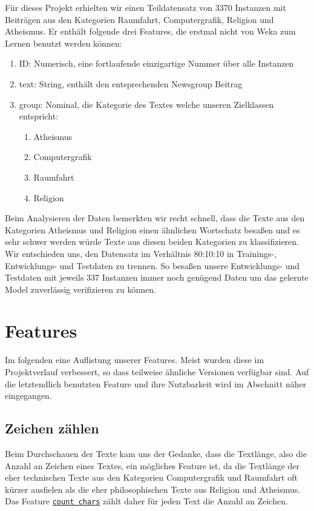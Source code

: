 \documentclass[
	11pt,
	a4paper
]{scrartcl}
\newcommand{\code}[1]{\texttt{\ul{#1}}}
\begin{document}
Für dieses Projekt erhielten wir einen Teildatensatz von 3370 Instanzen mit Beiträgen aus den Kategorien Raumfahrt,
Computergrafik, Religion und Atheismus. Er enthält folgende drei Features, die erstmal nicht von Weka zum
Lernen benutzt werden können:
\begin{enumerate}[label=\roman*), itemsep=0pt,parsep=0pt]
	\item ID: Numerisch, eine fortlaufende einzigartige Nummer über alle Instanzen
	\item text: String, enthält den entsprechenden Newsgroup Beitrag
	\item group: Nominal, die Kategorie des Textes welche unseren Zielklassen entspricht:
	\begin{enumerate}[label=\arabic*., itemsep=0pt,parsep=0pt, start=0]
		\item Atheismus
		\item Computergrafik
		\item Raumfahrt
		\item Religion
	\end{enumerate}
\end{enumerate}

Beim Analysieren der Daten bemerkten wir recht schnell, dass die Texte aus den Kategorien Atheismus und 
Religion einen ähnlichen Wortschatz besaßen und es sehr schwer werden würde Texte aus diesen beiden Kategorien zu 
klassifizieren.\\

Wir entschieden uns, den Datensatz im Verhältnis 80:10:10 in Trainings-, Entwicklungs- und Testdaten zu trennen. So besaßen
unsere Entwicklungs- und Testdaten mit jeweils 337 Instanzen immer noch genügend Daten um das gelernte Model zuverlässig 
verifizieren zu können.

\section{Features}
Im folgenden eine Auflistung unserer Features. Meist wurden diese im Projektverlauf verbessert, so dass teilweise ähnliche
Versionen verfügbar sind. Auf die letztendlich benutzten Feature und ihre Nutzbarkeit wird im Abschnitt \emph{}
näher eingegangen.

\subsection{Zeichen zählen}
Beim Durchschauen der Texte kam uns der Gedanke, dass die Textlänge, also die Anzahl an Zeichen eines Textes, ein mögliches Feature
ist, da die Textlänge der eher technischen Texte aus den Kategorien Computergrafik und Raumfahrt oft kürzer ausfielen als die eher
philosophischen Texte aus Religion und Atheismus.\\
Das Feature \code{count chars} zählt daher für jeden Text die Anzahl an Zeichen.\\
\end{document}
